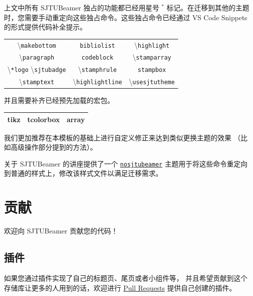 \documentclass[
    UTF8,
    heading=true,
    12pt,
    a4paper
]{ctexrep}
\newcommand{\cmd}[1]{\textbackslash{}\texttt{#1}}
\newcommand{\cls}[1]{\texttt{#1}}
\newcommand{\env}[1]{\texttt{#1}}
\def\themename{\textsf{SJTUBeamer}}
\begin{document}
上文中所有 \themename{} 独占的功能都已经用星号 $^*$
标记。在迁移到其他的主题时，您需要手动重定向这些独占命令。这些独占命令已经通过 VS Code
Snippets 的形式提供代码补全提示。

\begin{table}[h]
  \centering
  \begin{tabular}{ccc}
    \hline
    \cmd{makebottom}            &
    \env{bibliolist}            & \cmd{highlight}
    \\
    \cmd{paragraph}             & \env{codeblock}
                                &
    \cmd{stamparray}
    \\
    \cmd{*logo} \cmd{sjtubadge} &
    \cmd{stamphrule}            & \env{stampbox}
    \\
    \cmd{stamptext}             &
    \cmd{highlightline}         &
    \cmd{usesjtutheme}
    \\
    \hline
  \end{tabular}
\end{table}

并且需要补齐已经预先加载的宏包。

\begin{table}[h]
  \centering

  \begin{tabular}
    {>{\sffamily}c>{\sffamily}c>{\sffamily}c}
    \hline
    tikz & tcolorbox & array \\
    \hline
  \end{tabular}
\end{table}

我们更加推荐在本模板的基础上进行自定义修正来达到类似更换主题的效果
（比如高级操作部分提到的方法）。

关于 \themename{} 的讲座提供了一个
\href{https://github.com/sjtug/sjtulib-latex-talk/blob/logcreative-2022/beamerthemenosjtubeamer.sty}
{\cls{nosjtubeamer}}
主题用于将这些命令重定向到普通的样式上，修改该样式文件以满足迁移需求。

\chapter{贡献}

欢迎向 \themename{} 贡献您的代码！

\section{插件}

如果您通过插件实现了自己的标题页、尾页或者小组件等，
并且希望贡献到这个存储库让更多的人用到的话，欢迎进行
\href{https://github.com/sjtug/SJTUBeamer/pulls}{Pull Requests}
提供自己创建的插件。
\end{document}
